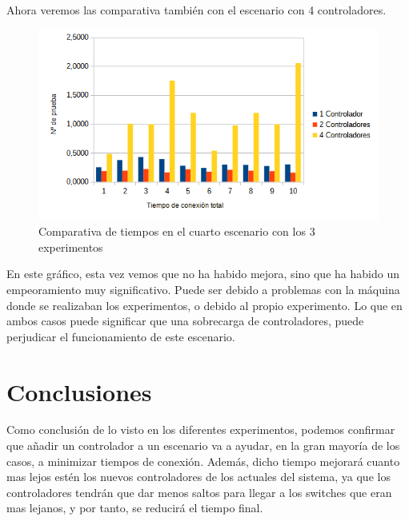 \documentclass[a4paper, 12pt]{book}
\begin{document}
	
	Ahora veremos las comparativa también con el escenario con 4 controladores.
	
	\begin{figure}[H]
		\centering
		\includegraphics[width=16cm, keepaspectratio]{img/comparativaFail}
		\caption{Comparativa de tiempos en el cuarto escenario con los 3 experimentos}
		\label{figura:comparativaFail}
	\end{figure}
	
	En este gráfico, esta vez vemos que no ha habido mejora, sino que ha habido un empeoramiento muy  significativo. Puede ser debido a problemas con la máquina donde se realizaban los experimentos, o debido al propio experimento. Lo que en ambos casos puede significar que una sobrecarga de controladores, puede perjudicar el funcionamiento de este escenario.
	
	
	
	\clearpage
	\chapter{Conclusiones}
	\label{chap:conclusiones}
	
	Como conclusión de lo visto en los diferentes experimentos, podemos confirmar que añadir un controlador a un escenario va a ayudar, en la gran mayoría de los casos, a minimizar tiempos de conexión. Además, dicho tiempo mejorará cuanto mas lejos estén los nuevos controladores de los actuales del sistema, ya que los controladores tendrán que dar menos saltos para llegar a los switches que eran mas lejanos, y por tanto, se reducirá el tiempo final.  
	
\end{document}
